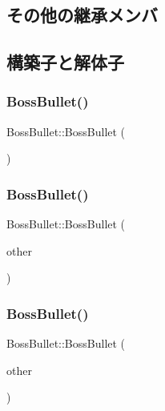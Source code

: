 \subsection*{その他の継承メンバ}


\subsection{構築子と解体子}
\mbox{\label{class_boss_bullet_acca8ecca1f90ed4454ca2bb3f20a86f9}} 
\subsubsection{\texorpdfstring{Boss\+Bullet()}{BossBullet()}\hspace{0.1cm}{\footnotesize\ttfamily [1/3]}}
{\footnotesize\ttfamily Boss\+Bullet\+::\+Boss\+Bullet (\begin{DoxyParamCaption}{ }\end{DoxyParamCaption})\hspace{0.3cm}{\ttfamily [inline]}}

\mbox{\label{class_boss_bullet_a3fc4ad096e796b25d28e19ae8e4339bf}} 
\subsubsection{\texorpdfstring{Boss\+Bullet()}{BossBullet()}\hspace{0.1cm}{\footnotesize\ttfamily [2/3]}}
{\footnotesize\ttfamily Boss\+Bullet\+::\+Boss\+Bullet (\begin{DoxyParamCaption}\item[{const \mbox{\hyperlink{class_boss_bullet}{Boss\+Bullet}} \&}]{other }\end{DoxyParamCaption})\hspace{0.3cm}{\ttfamily [inline]}}

\mbox{\label{class_boss_bullet_a852db4124cf1985c9bb612ef8a765722}} 
\subsubsection{\texorpdfstring{Boss\+Bullet()}{BossBullet()}\hspace{0.1cm}{\footnotesize\ttfamily [3/3]}}
{\footnotesize\ttfamily Boss\+Bullet\+::\+Boss\+Bullet (\begin{DoxyParamCaption}\item[{\mbox{\hyperlink{class_boss_bullet}{Boss\+Bullet}} \&\&}]{other }\end{DoxyParamCaption})\hspace{0.3cm}{\ttfamily [inline]}}



